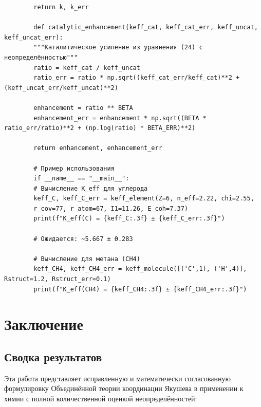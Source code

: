 \documentclass[12pt,a4paper]{article}
\theoremstyle{remark}
\begin{document}
\begin{verbatim}
		return k, k_err
		
		def catalytic_enhancement(keff_cat, keff_cat_err, keff_uncat, keff_uncat_err):
		"""Каталитическое усиление из уравнения (24) с неопределённостью"""
		ratio = keff_cat / keff_uncat
		ratio_err = ratio * np.sqrt((keff_cat_err/keff_cat)**2 + (keff_uncat_err/keff_uncat)**2)
		
		enhancement = ratio ** BETA
		enhancement_err = enhancement * np.sqrt((BETA * ratio_err/ratio)**2 + (np.log(ratio) * BETA_ERR)**2)
		
		return enhancement, enhancement_err
		
		# Пример использования
		if __name__ == "__main__":
		# Вычисление K_eff для углерода
		keff_C, keff_C_err = keff_element(Z=6, n_eff=2.22, chi=2.55, 
		r_cov=77, r_atom=67, I1=11.26, E_coh=7.37)
		print(f"K_eff(C) = {keff_C:.3f} ± {keff_C_err:.3f}")
		
		# Ожидается: ~5.667 ± 0.283
		
		# Вычисление для метана (CH4)
		keff_CH4, keff_CH4_err = keff_molecule([('C',1), ('H',4)], Rstruct=1.2, Rstruct_err=0.1)
		print(f"K_eff(CH4) = {keff_CH4:.3f} ± {keff_CH4_err:.3f}")
	\end{verbatim}
	
	\section{Заключение}
	\label{sec:conclusion}
	
	\subsection{Сводка результатов}
	
	Эта работа представляет исправленную и математически согласованную формулировку Объединённой теории координации Якушева в применении к химии с полной количественной оценкой неопределённостей:
	
\end{document}

